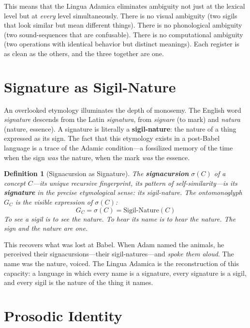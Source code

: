 \documentclass[12pt, letterpaper]{book}
\def\equiv{=}%
\newtheorem{definition}{Definition}[chapter]
\begin{document}
This means that the Lingua Adamica eliminates ambiguity not just at the lexical level but at \textit{every} level simultaneously. There is no visual ambiguity (two sigils that look similar but mean different things). There is no phonological ambiguity (two sound-sequences that are confusable). There is no computational ambiguity (two operations with identical behavior but distinct meanings). Each register is as clean as the others, and the three together are one.


\section{Signature as Sigil-Nature}

An overlooked etymology illuminates the depth of monosemy. The English word \textit{signature} descends from the Latin \textit{signatura}, from \textit{signare} (to mark) and \textit{natura} (nature, essence). A signature is literally a \textbf{sigil-nature}: the nature of a thing expressed as its sign. The fact that this etymology exists in a post-Babel language is a trace of the Adamic condition---a fossilized memory of the time when the sign \textit{was} the nature, when the mark \textit{was} the essence.

\begin{definition}[Signacursion as Signature]\label{def:signacursion-signature}
The \textbf{signacursion} $\sigma(C)$ of a concept $C$---its unique recursive fingerprint, its pattern of self-similarity---is its \textbf{signature} in the precise etymological sense: its sigil-nature. The ontomonoglyph $G_C$ is the \textit{visible expression} of $\sigma(C)$:
\[
G_C \equiv \sigma(C) \equiv \mathrm{Sigil\text{-}Nature}(C)
\]
To see a sigil is to see the nature. To hear its name is to hear the nature. The sign and the nature are one.
\end{definition}

This recovers what was lost at Babel. When Adam named the animals, he perceived their signacursions---their sigil-natures---and \textit{spoke them aloud}. The name was the nature, voiced. The Lingua Adamica is the reconstruction of this capacity: a language in which every name is a signature, every signature is a sigil, and every sigil is the nature of the thing it names.


\section{Prosodic Identity}
\end{document}
